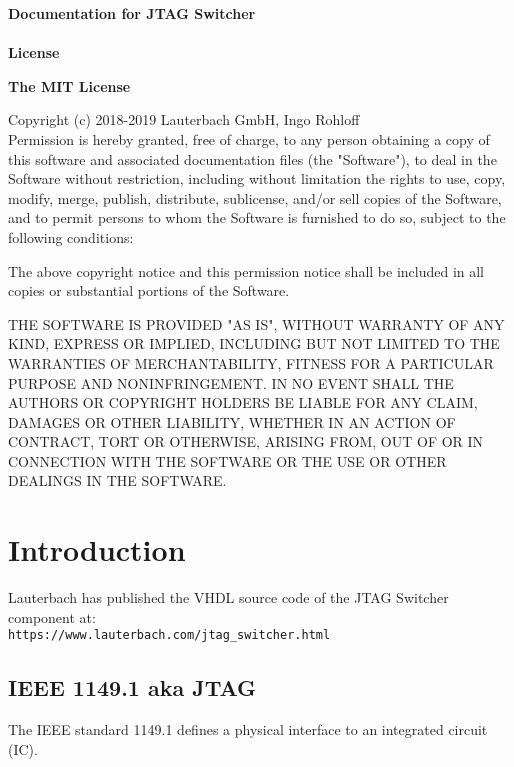 \documentclass[10pt,english,a4paper]{report}
\begin{document}

\begin{center}
	\vspace*{1.5\baselineskip}
	\large
	\textbf{\huge Documentation for JTAG Switcher}\\
	\vspace{1.5\baselineskip}
	{\gitdate}\\
	\vspace{10\baselineskip}
	\LARGE
	\textbf{License}\\
\end{center}
\textbf{The MIT License}

Copyright (c) 2018-2019 Lauterbach GmbH, Ingo Rohloff\\

Permission is hereby granted, free of charge,
to any person obtaining a copy of this software and
associated documentation files (the "Software"), to
deal in the Software without restriction, including
without limitation the rights to use, copy, modify,
merge, publish, distribute, sublicense, and/or sell
copies of the Software, and to permit persons to whom
the Software is furnished to do so,
subject to the following conditions:

The above copyright notice and this permission notice
shall be included in all copies or substantial portions of the Software.

THE SOFTWARE IS PROVIDED "AS IS", WITHOUT WARRANTY OF ANY KIND,
EXPRESS OR IMPLIED, INCLUDING BUT NOT LIMITED TO THE WARRANTIES
OF MERCHANTABILITY, FITNESS FOR A PARTICULAR PURPOSE AND NONINFRINGEMENT.
IN NO EVENT SHALL THE AUTHORS OR COPYRIGHT HOLDERS BE LIABLE FOR
ANY CLAIM, DAMAGES OR OTHER LIABILITY, WHETHER IN AN ACTION OF CONTRACT,
TORT OR OTHERWISE, ARISING FROM, OUT OF OR IN CONNECTION WITH THE
SOFTWARE OR THE USE OR OTHER DEALINGS IN THE SOFTWARE.

\cleardoublepage
{}

\setcounter{tocdepth}{10}
\renewcommand\contentsname{Table of Contents}
\tableofcontents

\chapter{Introduction}
Lauterbach has published the VHDL source code of the JTAG Switcher component at:\\
{\tt https://www.lauterbach.com/jtag\_switcher.html}

\section{IEEE 1149.1 aka JTAG}
The IEEE standard 1149.1 defines a physical interface to an integrated circuit (IC).
\end{document}
